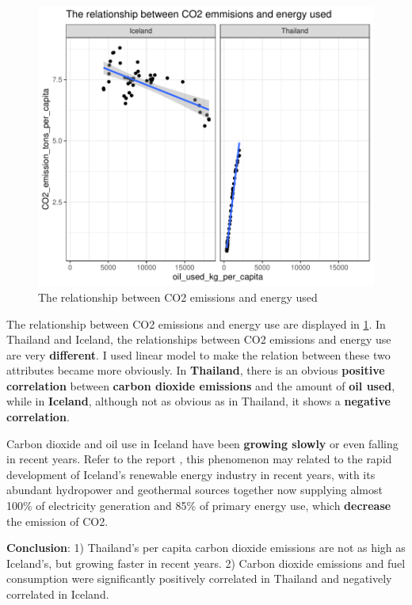 \documentclass[11pt,a4paper,]{article}
\begin{document}
\begin{figure}

{\centering \includegraphics{Figures/relationship-1} 

}

\caption{The relationship between CO2 emissions and energy used}\label{fig:relationship}
\end{figure}

The relationship between CO2 emissions and energy use are displayed in \ref{fig:relationship}.
\clearpage
In Thailand and Iceland, the relationships between CO2 emissions and energy use are very \textbf{different}. I used linear model to make the relation between these two attributes became more obviously. In \textbf{Thailand}, there is an obvious \textbf{positive correlation} between \textbf{carbon dioxide emissions} and the amount of \textbf{oil used}, while in \textbf{Iceland}, although not as obvious as in Thailand, it shows a \textbf{negative correlation}.

Carbon dioxide and oil use in Iceland have been \textbf{growing slowly} or even falling in recent years. Refer to the report \textcite{CookDavid2016EpiI}, this phenomenon may related to the rapid development of Iceland's renewable energy industry in recent years, with its abundant hydropower and geothermal sources together now supplying almost 100\% of electricity generation and 85\% of primary energy use, which \textbf{decrease} the emission of CO2.

\textbf{Conclusion}:
1) Thailand's per capita carbon dioxide emissions are not as high as Iceland's, but growing faster in recent years.
2) Carbon dioxide emissions and fuel consumption were significantly positively correlated in Thailand and negatively correlated in Iceland.
\end{document}
